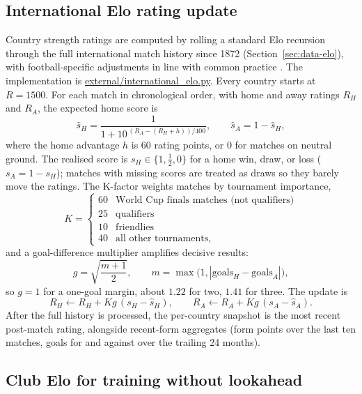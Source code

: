 \subsection{International Elo rating update}
\label{sec:appendix-b-elo}

Country strength ratings are computed by rolling a standard Elo
recursion \citep{elo1978rating} through the full international match
history since 1872 (Section~\ref{sec:data-elo}), with
football-specific adjustments in line with common practice
\citep{hvattum2010using}. The implementation is
\url{external/international_elo.py}. Every country starts at
$R = 1500$. For each match in chronological order, with home and away
ratings $R_H$ and $R_A$, the expected home score is
\begin{equation}
\hat{s}_H = \frac{1}{1 + 10^{\,(R_A - (R_H + h))/400}},
\qquad \hat{s}_A = 1 - \hat{s}_H,
\end{equation}
where the home advantage $h$ is 60 rating points, or 0 for matches on
neutral ground. The realised score is $s_H \in \{1, \tfrac12, 0\}$
for a home win, draw, or loss ($s_A = 1 - s_H$); matches with missing
scores are treated as draws so they barely move the ratings. The
K-factor weights matches by tournament importance,
\begin{equation}
K = \begin{cases}
60 & \text{World Cup finals matches (not qualifiers)} \\
25 & \text{qualifiers} \\
10 & \text{friendlies} \\
40 & \text{all other tournaments,}
\end{cases}
\end{equation}
and a goal-difference multiplier amplifies decisive results:
\begin{equation}
g = \sqrt{\frac{m + 1}{2}}, \qquad
m = \max\bigl(1, |\text{goals}_H - \text{goals}_A|\bigr),
\end{equation}
so $g = 1$ for a one-goal margin, about $1.22$ for two, $1.41$ for
three. The update is
\begin{equation}
R_H \leftarrow R_H + K g\, (s_H - \hat{s}_H),
\qquad
R_A \leftarrow R_A + K g\, (s_A - \hat{s}_A).
\end{equation}
After the full history is processed, the per-country snapshot is the
most recent post-match rating, alongside recent-form aggregates (form
points over the last ten matches, goals for and against over the
trailing 24 months).

\subsection{Club Elo for training without lookahead}
\label{sec:appendix-b-club-elo}

